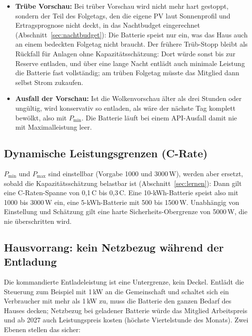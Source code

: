 \documentclass[11pt,a4paper]{article}
\begin{document}
\begin{itemize}
  \item \textbf{Trübe Vorschau:} Bei trüber Vorschau wird nicht mehr hart
    gestoppt, sondern der Teil des Folgetags, den die eigene PV laut
    Sonnenprofil und Ertragsprognose nicht deckt, in das Nachtbudget
    eingerechnet (Abschnitt~\ref{sec:nachtbudget}): Die Batterie speist
    nur ein, was das Haus auch an einem bedeckten Folgetag nicht
    braucht. Der frühere Trüb-Stopp bleibt als Rückfall für Anlagen ohne
    Kapazitätsschätzung: Dort würde sonst bis zur Reserve entladen, und
    über eine lange Nacht entlädt auch minimale Leistung die Batterie fast
    vollständig; am trüben Folgetag müsste das Mitglied dann selbst Strom
    zukaufen.
  \item \textbf{Ausfall der Vorschau:} Ist die Wolkenvorschau älter als
    drei Stunden oder ungültig, wird konservativ so entladen, als wäre der
    nächste Tag komplett bewölkt, also mit $P_{\min}$. Die Batterie läuft
    bei einem API-Ausfall damit nie mit Maximalleistung leer.
\end{itemize}

\subsection{Dynamische Leistungsgrenzen (C-Rate)}

$P_{\min}$ und $P_{\max}$ sind einstellbar (Vorgabe 1000 und 3000\,W),
werden aber ersetzt, sobald die Kapazitätsschätzung belastbar ist
(Abschnitt~\ref{sec:lernen}): Dann gilt eine C-Raten-Spanne von 0,1\,C bis
0,3\,C. Eine 10-kWh-Batterie speist also mit 1000 bis 3000\,W ein, eine
5-kWh-Batterie mit 500 bis 1500\,W. Unabhängig von Einstellung und
Schätzung gilt eine harte Sicherheits-Obergrenze von 5000\,W, die nie
überschritten wird.

\subsection{Hausvorrang: kein Netzbezug während der Entladung}

Die kommandierte Entladeleistung ist eine Untergrenze, kein Deckel.
Entlädt die Steuerung zum Beispiel mit 1\,kW an die Gemeinschaft und
schaltet sich ein Verbraucher mit mehr als 1\,kW zu, muss die Batterie den
ganzen Bedarf des Hauses decken; Netzbezug bei geladener Batterie würde das
Mitglied Arbeitspreis und ab 2027 auch Leistungspreis kosten (höchste
Viertelstunde des Monats). Zwei Ebenen stellen das sicher:
\end{document}
